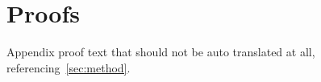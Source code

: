 \section{Proofs}
\label{sec:proofs}
Appendix proof text that should not be auto translated at all, referencing~\ref{sec:method}.

